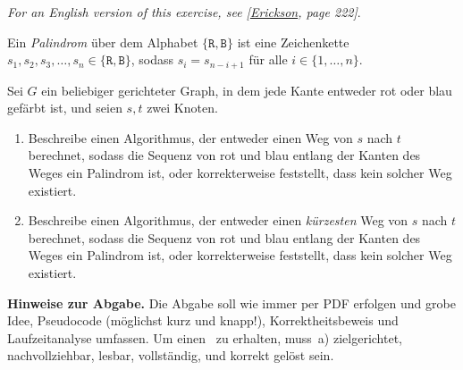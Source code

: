 \documentclass{uebung_cs}
\begin{document}
\textit{\footnotesize For an English version of this exercise, see [\href{https://jeffe.cs.illinois.edu/teaching/algorithms/book/Algorithms-JeffE.pdf}{Erickson}, page 222]}.

Ein \emph{Palindrom} über dem Alphabet $\{\texttt{R},\texttt{B}\}$ ist eine Zeichenkette $s_1,s_2,s_3,\dots,s_n\in\{\texttt{R},\texttt{B}\}$, sodass $s_i=s_{n-i+1}$ für alle $i\in\{1,\dots,n\}$.

Sei $G$ ein beliebiger gerichteter Graph, in dem jede Kante entweder rot oder blau gefärbt ist, und seien $s,t$ zwei Knoten.
\begin{enumerate}
    \item Beschreibe einen Algorithmus, der entweder einen Weg von $s$ nach $t$ berechnet, sodass die Sequenz von rot und blau entlang der Kanten des Weges ein Palindrom ist, oder korrekterweise feststellt, dass kein solcher Weg existiert.
    \item Beschreibe einen Algorithmus, der entweder einen \emph{kürzesten} Weg von $s$ nach $t$ berechnet, sodass die Sequenz von rot und blau entlang der Kanten des Weges ein Palindrom ist, oder korrekterweise feststellt, dass kein solcher Weg existiert.
\end{enumerate}

\textbf{Hinweise zur Abgabe.}
Die Abgabe soll wie immer per PDF erfolgen und grobe Idee, Pseudocode (möglichst kurz und knapp!), Korrektheitsbeweis und Laufzeitanalyse umfassen. Um einen~ zu erhalten, muss~a) zielgerichtet, nachvollziehbar, lesbar, vollständig, und korrekt gelöst sein.


\end{document}

